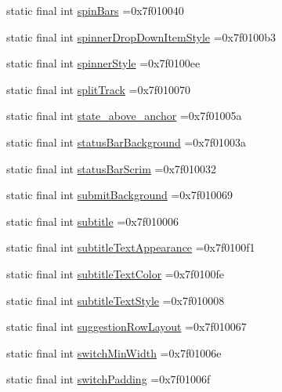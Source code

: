 \begin{DoxyCompactItemize}
\item 
static final int \hyperlink{classcheck_1_1test_1_1_r_1_1attr_a36af18fcdeac8b37c27afbf2e44385bf}{spin\+Bars} =0x7f010040
\item 
static final int \hyperlink{classcheck_1_1test_1_1_r_1_1attr_a020a7df4dde5cf057bd1e5101a5782dc}{spinner\+Drop\+Down\+Item\+Style} =0x7f0100b3
\item 
static final int \hyperlink{classcheck_1_1test_1_1_r_1_1attr_a8fc35d027aa55da918e529af0239cd45}{spinner\+Style} =0x7f0100ee
\item 
static final int \hyperlink{classcheck_1_1test_1_1_r_1_1attr_ab99b6ed868beb51a77072e77f5938343}{split\+Track} =0x7f010070
\item 
static final int \hyperlink{classcheck_1_1test_1_1_r_1_1attr_a54549315b6f2f0ff9fab6bb732761d35}{state\+\_\+above\+\_\+anchor} =0x7f01005a
\item 
static final int \hyperlink{classcheck_1_1test_1_1_r_1_1attr_a2dad671700479c49f02a7617b4b41b9b}{status\+Bar\+Background} =0x7f01003a
\item 
static final int \hyperlink{classcheck_1_1test_1_1_r_1_1attr_a6c4449ac97eb2616059433f47cbaeb84}{status\+Bar\+Scrim} =0x7f010032
\item 
static final int \hyperlink{classcheck_1_1test_1_1_r_1_1attr_a5fe58849f07f3b5684db0abc31d73d52}{submit\+Background} =0x7f010069
\item 
static final int \hyperlink{classcheck_1_1test_1_1_r_1_1attr_aba79cc7bd7219629cd636e1c463aa4af}{subtitle} =0x7f010006
\item 
static final int \hyperlink{classcheck_1_1test_1_1_r_1_1attr_ae5a7dacf52c904d4e7fdc131f9f9c67a}{subtitle\+Text\+Appearance} =0x7f0100f1
\item 
static final int \hyperlink{classcheck_1_1test_1_1_r_1_1attr_ae5402664969908118713cc1f648a3312}{subtitle\+Text\+Color} =0x7f0100fe
\item 
static final int \hyperlink{classcheck_1_1test_1_1_r_1_1attr_a9cca12a24b4e55c67ec8573d8aca9d25}{subtitle\+Text\+Style} =0x7f010008
\item 
static final int \hyperlink{classcheck_1_1test_1_1_r_1_1attr_aa1d2db971e8289c75a03c38ae25812e1}{suggestion\+Row\+Layout} =0x7f010067
\item 
static final int \hyperlink{classcheck_1_1test_1_1_r_1_1attr_aab06ab49d50f5d3f49bf75148054587f}{switch\+Min\+Width} =0x7f01006e
\item 
static final int \hyperlink{classcheck_1_1test_1_1_r_1_1attr_a142f39b9fb3ad458745e991e3a049d97}{switch\+Padding} =0x7f01006f

\end{DoxyCompactItemize}
